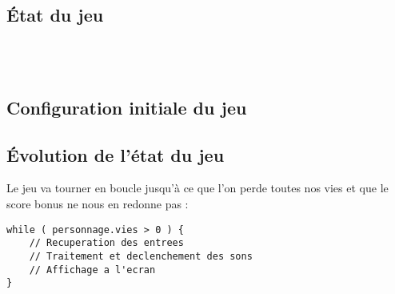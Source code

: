 \subsection{État du jeu}
\begin{typeag}[Personnage]
        \\
        \\
\end{typeag}

\subsection{Configuration initiale du jeu}

\subsection{Évolution de l'état du jeu}
Le jeu va tourner en boucle jusqu'à ce que l'on perde toutes nos vies et que le score bonus ne nous en redonne pas :
\begin{lstlisting}
while ( personnage.vies > 0 ) {
	// Recuperation des entrees
	// Traitement et declenchement des sons
	// Affichage a l'ecran
}
\end{lstlisting}
